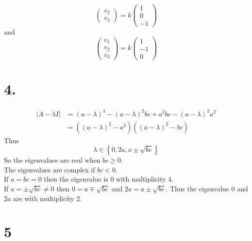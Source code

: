 \documentclass[11pt]{article}
\theoremstyle{mystyle}
\theoremstyle{definition}
\begin{document}
\begin{itemize}
\[\begin{pmatrix}
        v_2 \\
        v_3 
      \end{pmatrix}
      = k 
      \begin{pmatrix}
        1 \\
        0 \\
        -1
      \end{pmatrix}
    \]
    and 
    \[
      \begin{pmatrix}
        v_1 \\
        v_2 \\
        v_3 
      \end{pmatrix}
      = k 
      \begin{pmatrix}
        1 \\
        -1 \\
        0
      \end{pmatrix}
    \]
\end{itemize}
\clearpage 
\section*{4.}
\begin{align*}
  |A - \lambda I| &= (a-\lambda)^4  - (a-\lambda)^2 bc + a^2 bc - (a-\lambda)^2 a^2 \\
  &= ((a-\lambda)^2 - a^2) ( (a-\lambda)^2 - bc)
\end{align*}
Thus 
\[
  \lambda \in \left\{0, 2a, a \pm \sqrt{bc}\right\}
\]
So the eigenvalues are real when $bc \ge 0$. \\
The eigenvalues are complex if $bc < 0$. \\
If $a = bc = 0$ then the eigenvalue is $0$ with multiplicity 4. \\
If $a = \pm \sqrt{bc} \ne 0$ then $0 = a \mp \sqrt{bc}$ and $2a = a \pm \sqrt{bc}$. Thus the eigenvalue $0$ and $2a$ are with multiplicity 2. 
\clearpage 
\section*{5}
\end{document}
